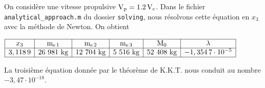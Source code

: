 \question On considère une vitesse propulsive $\mathrm{V}_{\mathrm{p}} = 1.2\,\mathrm{V}_{\mathrm{c}}$. Dans le fichier \verb+analytical_approach.m+ du dossier \verb+solving+, nous résolvons cette équation en $x_3$ avec la méthode de Newton. On obtient

\begin{center}
$\begin{array}{|c|c|c|c|c|c|}\hline
x_3 & \masspropel{1} & \masspropel{2} & \masspropel{3} & \mathrm{M}_{0} & \lambda\\\hline
3,118\,9 & 26\ 981\text{ kg}& 12\ 704\text{ kg} & 5\ 516\text{ kg} & 52\ 408\text{ kg} & -1,354\,7\cdot 10^{-5}\\\hline
\end{array}$
\end{center}

La troisième équation donnée par le théorème de K.K.T. nous conduit au nombre $-3,47\cdot 10^{-18}$.

